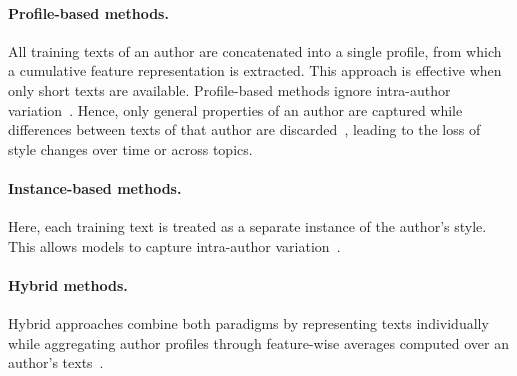 \paragraph{Profile-based methods.} 
All training texts of an author are concatenated into a single profile, from which a cumulative feature representation is extracted. 
This approach is effective when only short texts are available.
Profile-based methods ignore intra-author variation~\citep{stamatatos_survey_2009,elmanarelbouanani_authorship_2014,neal_surveying_2018}.
Hence, only general properties of an author are captured while differences between texts of that author are discarded~\citep{elmanarelbouanani_authorship_2014}, leading to the loss of style changes over time or across topics.

\paragraph{Instance-based methods.} 
Here, each training text is treated as a separate instance of the author's style. 
This allows models to capture intra-author variation~\citep{stamatatos_survey_2009,altakrori_topic_2021,elmanarelbouanani_authorship_2014,neal_surveying_2018}.  

\paragraph{Hybrid methods.} 
Hybrid approaches combine both paradigms by representing texts individually while aggregating author profiles through feature-wise averages computed over an author’s texts~\citep{stamatatos_survey_2009}. 
